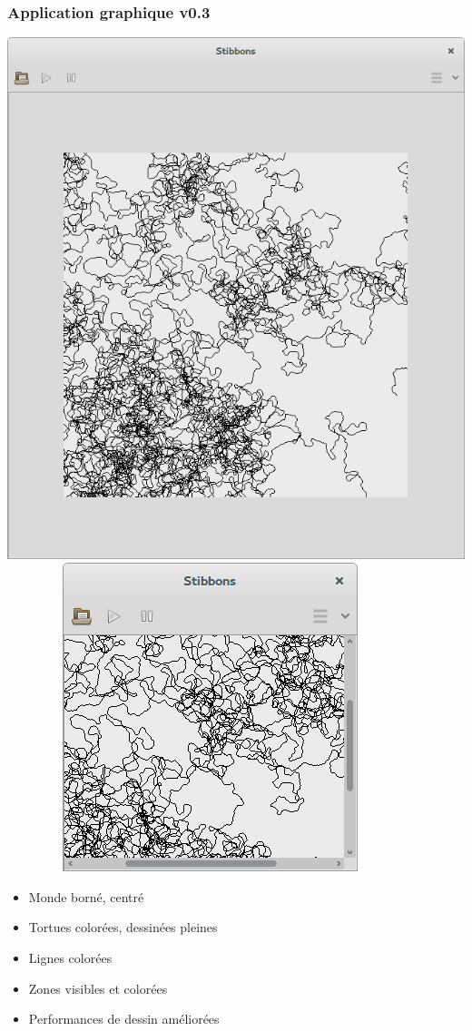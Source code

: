 \begin{frame}
\frametitle{Application graphique v0.3}
\begin{center}
\includegraphics[scale=0.16]{doc/Presentation/screenshot/stibbons-0-3-2.png}
~~~~~~~~
\includegraphics[scale=0.16]{doc/Presentation/screenshot/stibbons-0-3-3.png}
\end{center}

\begin{itemize}
	\item Monde borné, centré
	\item Tortues colorées, dessinées pleines
	\item Lignes colorées
	\item Zones visibles et colorées
	\item Performances de dessin améliorées
\end{itemize}
\end{frame}

